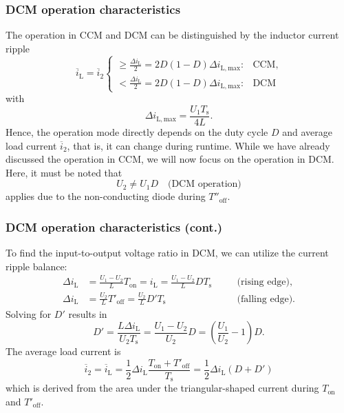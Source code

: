 \begin{frame}
    \frametitle{DCM operation characteristics}
    The operation in CCM and DCM can be distinguished by the inductor current ripple
    \begin{equation}
        \overline{i}_\mathrm{L}=\overline{i}_2\begin{cases}
            \geq \frac{\Delta i_\mathrm{L}}{2}= 2D(1-D)\Delta i_\mathrm{L,max}: & \text{CCM},\\
            < \frac{\Delta i_\mathrm{L}}{2}= 2D(1-D)\Delta i_\mathrm{L,max}: & \text{DCM}
        \end{cases}
    \end{equation}
    with $$\Delta i_\mathrm{L,max} = \frac{U_1T_\mathrm{s}}{4L}.$$
    Hence, the operation mode directly depends on the duty cycle $D$ and average load current $\overline{i}_2$, that is, it can change during runtime. While we have already discussed the operation in CCM, we will now focus on the operation in DCM. Here, it must be noted that
    $$ U_2 \neq U_1 D \quad \mbox{(DCM operation)}$$
    applies due to the non-conducting diode during  $T''_\mathrm{off}$.
\end{frame}

\begin{frame}
    \frametitle{DCM operation characteristics (cont.)}
    To find the input-to-output voltage ratio in DCM, we can utilize the current ripple balance:
    \begin{equation}
        \begin{alignedat}{2}
            \Delta i_\mathrm{L} &= \frac{U_1-U_2}{L}T_\mathrm{on} = i_\mathrm{L} = \frac{U_1-U_2}{L}DT_\mathrm{s} \quad &&\mbox{(rising edge)},\\
            \Delta i_\mathrm{L} &= \frac{U_2}{L}T'_\mathrm{off} = \frac{U_2}{L}D'T_\mathrm{s} \quad &&\mbox{(falling edge)}.
        \end{alignedat}
    \end{equation}
    Solving for $D'$ results in
    \begin{equation}
        D' = \frac{L\Delta i_\mathrm{L}}{U_2T_\mathrm{s}} = \frac{U_1-U_2}{U_2}D = \left(\frac{U_1}{U_2}-1\right)D.
        \label{eq:Dprime-DCM}
    \end{equation}
    The average load current is
    \begin{equation}
        \overline{i}_2 = \overline{i}_\mathrm{L} = \frac{1}{2}\Delta i_\mathrm{L}\frac{T_\mathrm{on}+T'_\mathrm{off}}{T_\mathrm{s}} = \frac{1}{2}\Delta i_\mathrm{L}(D+D')
        \label{eq:average-load-current-DCM}
    \end{equation}
    which is derived from the area under the triangular-shaped current during $T_\mathrm{on}$ and $T'_\mathrm{off}$. 
\end{frame}

